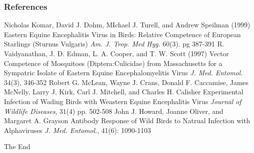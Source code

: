 \documentclass{beamer}
\begin{document}

\begin{frame}
\frametitle{References}
\footnotesize{
\begin{thebibliography}{99} %
 Nicholas Komar, David J. Dohm, MIchael J. Turell, and Andrew Speilman (1999)
\newblock Eastern Equine Encephalitis Virus in Birds: Relative Competence of European Starlings (Sturnus Vulgaris)
\newblock \emph{Am. J. Trop. Med Hyg.} 60(3). pg 387-391
 R. Vaidyanathan, J. D. Edman, L. A. Cooper, and T. W. Scott (1997)
\newblock Vector Competence of Mosquitoes (Diptera:Culicidae) from Massachusetts for a Sympatric Isolate of Eastern Equine Encephalomyelitis Virus
\newblock \emph{J. Med. Entomol.} 34(3), 346-352
 Robert G. McLean, Wayne J. Crans, Donald F. Caccamise, James McNelly, Larry J. Kirk, Carl J. Mitchell, and Charles H. Calisher
\newblock Experimental Infection of Wading Birds with Weastern Equine Encephalitis Virus
\newblock \emph{Journal of Wildlife Diseases}, 31(4) pp. 502-508
\bibitem[Howard 2004] John J. Howard, Joanne Oliver, and Margaret A. Grayson
\newblock Antibody Response of Wild Birds to Natrual Infection with Alphaviruses
\newblock \emph{J. Med. Entomol.}, 41(6): 1090-1103

\end{thebibliography}
}
\end{frame}


\begin{frame}
\Huge{\centerline{The End}}
\end{frame}

\end{document}
